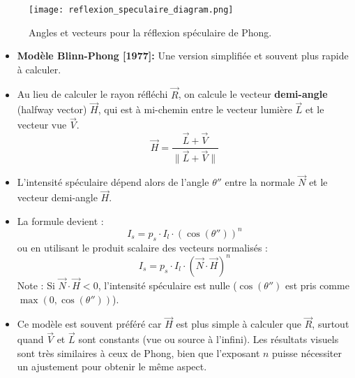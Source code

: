 \documentclass{article}
\begin{document}
\begin{figure}[H]
\centering
\texttt{[image: reflexion\_speculaire\_diagram.png]}
\caption{Angles et vecteurs pour la réflexion spéculaire de Phong.}
\label{fig:reflexion_speculaire_diagram}
\end{figure}

\begin{itemize}
    \item \textbf{Modèle Blinn-Phong [1977]:} Une version simplifiée et souvent plus rapide à calculer.
    \item Au lieu de calculer le rayon réfléchi $\vec{R}$, on calcule le vecteur \textbf{demi-angle} (halfway vector) $\vec{H}$, qui est à mi-chemin entre le vecteur lumière $\vec{L}$ et le vecteur vue $\vec{V}$.
      \[ \vec{H} = \frac{\vec{L} + \vec{V}}{\|\vec{L} + \vec{V}\|} \]
    \item L'intensité spéculaire dépend alors de l'angle $\theta''$ entre la normale $\vec{N}$ et le vecteur demi-angle $\vec{H}$.
    \item La formule devient :
      \[ I_s = p_s \cdot I_l \cdot (\cos(\theta''))^n \]
      ou en utilisant le produit scalaire des vecteurs normalisés :
      \[ I_s = p_s \cdot I_l \cdot (\vec{N} \cdot \vec{H})^n \]
       Note : Si $\vec{N} \cdot \vec{H} < 0$, l'intensité spéculaire est nulle ($\cos(\theta'')$ est pris comme $\max(0, \cos(\theta''))$).
    \item Ce modèle est souvent préféré car $\vec{H}$ est plus simple à calculer que $\vec{R}$, surtout quand $\vec{V}$ et $\vec{L}$ sont constants (vue ou source à l'infini). Les résultats visuels sont très similaires à ceux de Phong, bien que l'exposant $n$ puisse nécessiter un ajustement pour obtenir le même aspect.
\end{itemize}
\end{document}
